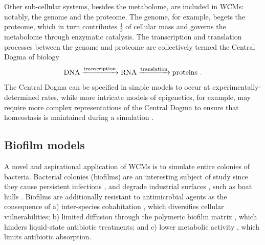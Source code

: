 Other sub-cellular systems, besides the metabolome, are included in WCMs: notably, the genome and the proteome. The genome, for example, begets the proteome, which in turn contributes $\frac{1}{3}$ of cellular mass \cite{Vakser2019ComputationalCell} and governs the metabolome through enzymatic catalysis. The transcription and translation processes between the genome and proteome are collectively termed the Central Dogma of biology
\begin{equation} \label{central_dogma}
    \ce{DNA ->[transcription] RNA ->[translation] proteins}~.
\end{equation}
The Central Dogma can be specified in simple models to occur at experimentally-determined rates, while more intricate models of epigenetics, for example, may require more complex representations of the Central Dogma to ensure that homeostasis is maintained during a simulation \cite{Karr2012}.

\subsection{Biofilm models}
A novel and aspirational application of WCMs is to simulate entire colonies of bacteria. Bacterial colonies (biofilms)  \cite{Otto2018StaphylococcalBiofilms,Mazza2016TheIntroduction} are an interesting subject of study since they cause persistent infections \cite{Lebeaux2014Biofilm-RelatedAntibiotics,Metcalf2013BiofilmEvidence,Jamal2018BacterialInfections,Singhai2012AResistance,Coenye2007BiofilmFactors,Baldan2014AdaptationCo-infection,Kropec2005Poly-N-AcetylglucosamineInfection,Potera1999ForgingDisease,Ramsey2004PseudomonasEnvironments,Stewart2014BiophysicsInfection}, and degrade industrial surfaces \cite{Herzberg2007BiofoulingPressure,Herzberg2008PhysiologyAeruginosa,Matin2011BiofoulingPrevention}, such as boat hulls \cite{Schultz2011EconomicShip,1952ChapterFouling,Coetser2005BiofoulingSystems,Callow2002MarineProblem}. Biofilms are additionally resistant to antimicrobial agents \cite{Lewis2001RiddleResistance} as the consequence of a) inter-species cohabitation \cite{Pereira2011SusceptibilityStudy}, which diversifies cellular vulnerabilities; b) limited diffusion through the polymeric biofilm matrix \cite{Suci1994InvestigationBiofilms,Hoyle1992PseudomonasPiperacillin,LeChevallier1988InactivationBacteria,Dunne1993DiffusionBiofilm,DeBeer1994DirectDisinfection}, which hinders liquid-state antibiotic treatments; and c) lower metabolic activity \cite{Mah2001MechanismsAgents,Sauer2004CharacterizationBiofilm,Suntharalingam2005QuorumFormation}, which limits antibiotic absorption.


